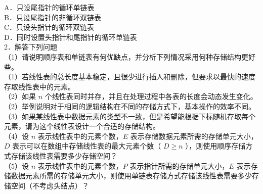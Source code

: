 \documentclass[10pt]{article}
\begin{document}
A．只设尾指针的循环单链表\\
B．只设尾指针的非循环双链表\\
C．只设头指针的循环双链表\\
D．同时设置头指针和尾指针的循环单链表\\
2．解答下列问题\\
（1）请说明顺序表和单链表有何优缺点，并分析下列情况采用何种存储结构更好些。\\
（1）若线性表的总长度基本稳定，且很少进行插人和删除，但要求以最快的速度存取线性表中的元素。\\
（2）如果 $n$ 个线性表同时并存，并且在处理过程中各表的长度会动态发生变化。\\
（2）举例说明对于相同的逻辑结构在不同的存储方式下，基本操作的效率不同。\\
（3）如果某线性表中数据元素的类型不一致，但是希望能根据下标随机存取每个元素，请为这个线性表设计一个合适的存储结构。\\
（4）设 $n$ 表示线性表中的元素个数，$E$ 表示存储数据元素所需的存储单元大小，$D$ 表示可以在数组中存储线性表的最大元素个数（ $D \geqslant n$ ），则使用顺序存储方式存储该线性表需要多少存储空间？\\
（5）设 $n$ 表示线性表中的元素个数，$P$ 表示指针所需的存储单元大小，$E$ 表示存储数据元素所需的存储单元大小，则使用单链表存储方式存储该线性表需要多少存储空间（不考虑头结点）？
\end{document}
